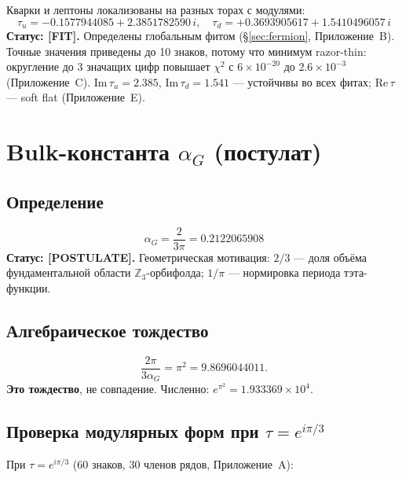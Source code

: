 \documentclass[12pt,a4paper]{article}
\numberwithin{equation}{section}
\begin{document}
Кварки и лептоны локализованы на разных торах с модулями:
\begin{equation}
\boxed{\;\tau_u = -0.1577944085 + 2.3851782590\,i, \quad
\tau_d = +0.3693905617 + 1.5410496057\,i\;}
\label{eq:tau-fit}
\end{equation}
\textbf{Статус: [FIT].} Определены глобальным фитом (\S\ref{sec:fermion},
Приложение~B). Точные значения приведены до 10 знаков, потому что
минимум razor-thin: округление до 3 значащих цифр повышает
$\chi^2$ с $6\times10^{-20}$ до $2.6\times10^{-3}$ (Приложение~C).
$\mathrm{Im}\,\tau_u = 2.385$, $\mathrm{Im}\,\tau_d = 1.541$ ---
устойчивы во всех фитах; $\mathrm{Re}\,\tau$ --- soft flat
(Приложение~E).

\section{Bulk-константа $\alpha_G$ (постулат)}
\label{sec:alpha}

\subsection{Определение}

\begin{equation}
\boxed{\;\alpha_G = \frac{2}{3\pi} = 0.2122065908\;}
\label{eq:alphaG}
\end{equation}
\textbf{Статус: [POSTULATE].} Геометрическая мотивация:
$2/3$ --- доля объёма фундаментальной области $\mathbb{Z}_3$-орбифолда;
$1/\pi$ --- нормировка периода тэта-функции.

\subsection{Алгебраическое тождество}

\begin{equation}
\frac{2\pi}{3\alpha_G} = \pi^2 = 9.8696044011.
\label{eq:identity}
\end{equation}
\textbf{Это тождество}, не совпадение. Численно:
$e^{\pi^2} = 1.933369\times10^4$.

\subsection{Проверка модулярных форм при $\tau = e^{i\pi/3}$}
\label{sec:Ycheck}

При $\tau = e^{i\pi/3}$ (60 знаков, 30 членов рядов, Приложение~A):
\end{document}
